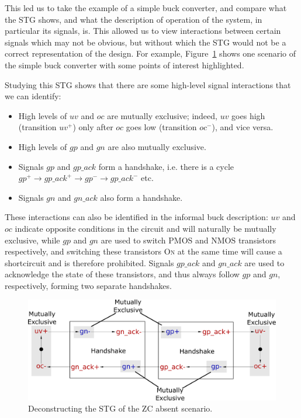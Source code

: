 \documentclass[british, journal]{IEEEtran}
\newcommand{\noun}[1]{\textsc{#1}}
\begin{document}
This led us to take the example of a simple buck converter, and compare what
the STG shows, and what the description of operation of the system, in
particular its signals, is. This allowed us to view interactions between
certain signals which may not be obvious, but without which the STG would not
be a correct representation of the design. For example,
Figure~\ref{fig:stg-breakdown} shows one scenario of the simple buck converter
with some points of interest highlighted.

Studying this STG shows that there are some high-level signal interactions that
we can identify:
\begin{itemize}
\item High levels of $uv$ and $oc$ are mutually exclusive; indeed, $uv$ goes
high (transition $uv^{+}$) only after $oc$ goes low (transition $oc^{-}$), and vice
versa.
\item High levels of $gp$ and $gn$ are also mutually exclusive.
\item Signals $gp$ and $gp\_ack$ form a handshake, i.e. there is a cycle
$gp^{+} \rightarrow gp\_ack^{+} \rightarrow gp^{-} \rightarrow gp\_ack^{-}$ etc.
\item Signals $gn$ and $gn\_ack$ also form a handshake.
\end{itemize}

These interactions can also be identified in the informal buck description:
$uv$ and $oc$ indicate opposite conditions in the circuit and will naturally be
mutually exclusive, while $gp$ and $gn$ are used to switch PMOS and NMOS
transistors respectively, and switching these transistors \noun{On} at the same
time will cause a shortcircuit and is therefore prohibited. Signals $gp\_ack$
and $gn\_ack$ are used to acknowledge the state of these transistors, and thus
always follow $gp$ and $gn$, respectively, forming two separate handshakes.

\begin{figure}[t]
\begin{centering}
\includegraphics[scale=0.225]{Images/stg-breakdown}
\par
\protect\caption{\label{fig:stg-breakdown}Deconstructing the STG of the ZC absent scenario.}
\par\end{centering}
\vspace{-4mm}
\end{figure}
\end{document}
